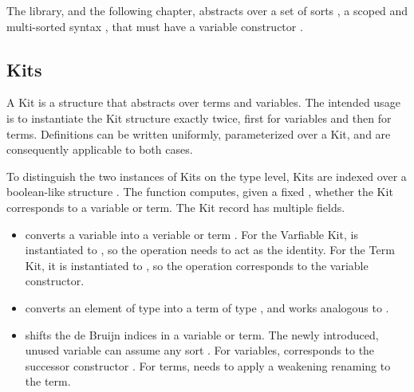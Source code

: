 \documentclass[screen,nonacm]{acmart}
\begin{document}
The library, and the following chapter, abstracts over a set of sorts
\ASortParam, a scoped and multi-sorted syntax \AScopedT, that must have a
variable constructor \AVarCstr.

\subsection{Kits}\label{sec:ags-kit}
A Kit is a structure that abstracts over terms and variables. The intended
usage is to instantiate the Kit structure exactly twice, first for variables
and then for terms. Definitions can be written uniformly, parameterized over a
Kit, and are consequently applicable to both cases.

\begin{minipage}[t]{0.48\linewidth}
      \raggedright{}
      \AKit{}
      \AOpenKit{}
\end{minipage}
\begin{minipage}[t]{0.48\linewidth}
      \raggedright{}
      \AModeDef{}
      \AImage{}
\end{minipage}

\noindent To distinguish the two instances of Kits on the type level, Kits are indexed over
a boolean-like structure . The  function computes,
given a fixed , whether the Kit corresponds to a variable or
term. The Kit record has multiple fields.
\begin{itemize}
      \item {} converts a variable into a veriable or term   .
            For the Varfiable Kit,  is instantiated to , so the operation needs to act as the identity.
            For the Term Kit, it is instantiated to , so the operation corresponds to the variable constructor.
      \item {} converts an element of type    into a term of type   , and works analogous to .
      \item {} shifts the de Bruijn indices in a variable or term.
            The newly introduced, unused variable  can assume any sort .
            For variables,  corresponds to the successor constructor .
            For terms,  needs to apply a weakening renaming to the term.
\end{itemize}
\end{document}
